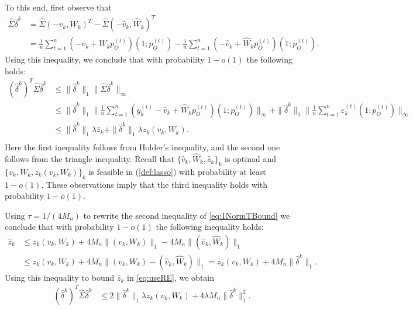 \documentclass[opre,nonblindrev]{informs3} %
\begin{document}
\begin{APPENDIX}{}
To this end, first observe
that
\begin{equation}
\begin{aligned}
\hat \Sigma \hat \delta^k
&= \hat \Sigma (-v_k, W_k)^T - \hat \Sigma (-\hat v_k, \hat W_k)^T \\
&=
\frac{1}{n}\sum_{t=1}^n ( -v_k +  W_kp_O^{(t)})(1;p_O^{(t)})
-
\frac{1}{n}\sum_{t=1}^n (-\hat v_k + \hat W_kp_O^{(t)})(1;p_O^{(t)}).
\end{aligned}
\end{equation}
Using this inequality, we conclude that
with probability
$1-o(1)$
the following holds:
\begin{equation}\label{eq:useRE}
\begin{array}{rl}
(\hat\delta^k)^T\hat \Sigma \hat\delta^k & \leq  \|\hat\delta^k\|_1 \|\hat\Sigma \hat\delta^k\|_\infty \\
&\leq   \|\hat\delta^k\|_1  \| \frac{1}{n}\sum_{t=1}^n (y_k^{(t)}-\hat v_k+\hat W_kp_O^{(t)})(1;p_O^{(t)})\|_\infty + \|\hat\delta^k\|_1\| \frac{1}{n}\sum_{t=1}^n \varepsilon_k^{(t)}(1;p_O^{(t)})\|_\infty\\
& \leq \|\hat\delta^k\|_1 \lambda \hat z_k + \|\hat\delta^k\|_1 \lambda z_k(v_k,W_k).\\
\end{array}
\end{equation}
Here the first inequality  follows from Holder's inequality, and the second one follows from the triangle inequality.
Recall that  $\{\hat v_k,\hat W_k,\hat z_k\}_k$ is optimal and $\{v_k,W_k,z_k(v_k,W_k)\}_k$ is feasible in
 (\ref{def:lasso})  with probability at least $1-o(1)$. These observations imply  that
 the third inequality holds with probability $1-o(1)$.

Using $\tau=1/(4M_n)$ to
rewrite the second inequality of
\eqref{eq:1NormTBound} we conclude that with probability $1-o(1)$ the following inequality holds:
\begin{equation}
\begin{aligned}
\hat{z}_k &\leq z_k(v_k,W_k) + 4M_n \| (v_k,W_k)\|_1 -4M_n  \| (\hat v_k,\hat W_k)\|_1 \\
&\leq
z_k(v_k,W_k) + 4M_n  \| (v_k,W_k)- (\hat v_k,\hat W_k)\|_1
=
z_k(v_k,W_k) + 4M_n \|\hat{\delta}^k\|_1.
\end{aligned}
\end{equation}
 Using this inequality to bound $\hat{z}_k$ in \eqref{eq:useRE}, we obtain
 \begin{equation}\label{eq:boundDeltaK}
 \begin{aligned}
 (\hat\delta^k)^T\hat \Sigma \hat\delta^k & \leq 2 \|\hat\delta^k\|_1 \lambda z_k(v_k,W_k) +
  4 \lambda M_n  \|\hat\delta^k\|_1^2.
 \end{aligned}
 \end{equation}


\end{APPENDIX}
\end{document}
